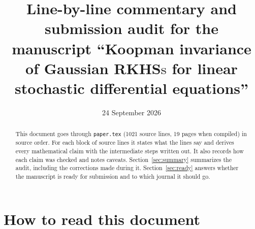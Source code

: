 \documentclass[11pt]{amsart}
\newcommand{\file}[1]{\texttt{#1}}
\begin{document}
\title[Commentary on the manuscript]{Line-by-line commentary and submission audit for the manuscript
``Koopman invariance of Gaussian RKHS$\text{s}$ for linear stochastic differential equations''}
\date{24 September 2026}

\begin{abstract}
This document goes through \file{paper.tex} (1021 source lines, 19 pages when compiled) in source order. For each
block of source lines it states what the lines say and derives every mathematical claim with the intermediate steps
written out. It also records how each claim was checked and notes caveats. Section~\ref{sec:summary} summarizes the
audit, including the corrections made during it. Section~\ref{sec:ready} answers whether the manuscript is ready for
submission and to which journal it should go.
\end{abstract}

\maketitle
\tableofcontents

\section{How to read this document}\label{sec:howto}
\end{document}
